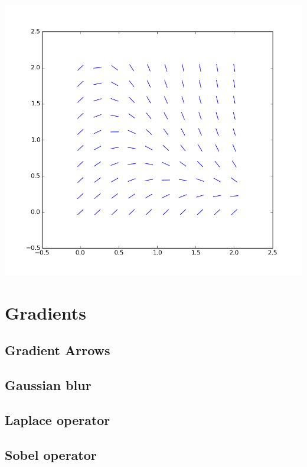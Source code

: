 \documentclass[a4paper,12px]{article}
\begin{document}
\vspace{2cm}
\begin{center}
    \includegraphics[width=(\textwidth/6*5)]{slopefield}
\end{center}
\clearpage

\tableofcontents
\vspace{5mm}


\section{Gradients}
\subsection{Gradient Arrows}


\subsection{Gaussian blur}


\subsection{Laplace operator}


\subsection{Sobel operator}
\end{document}
